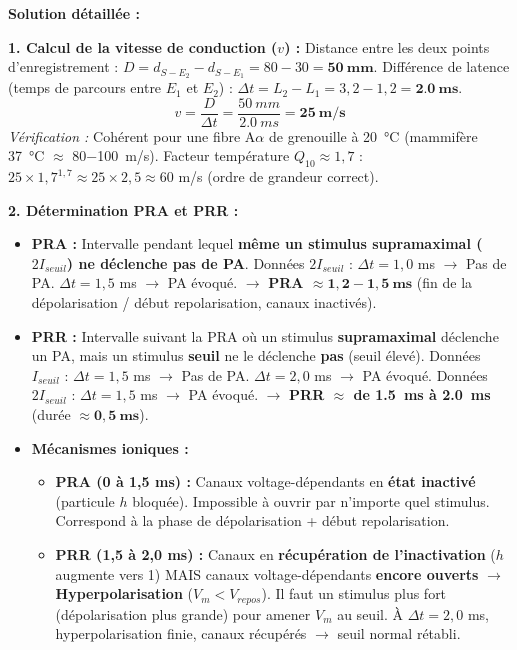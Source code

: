 \documentclass[11pt]{article}
\begin{document}
\begin{exoresolu}
\tcblower
\textbf{Solution détaillée :}

\textbf{1. Calcul de la vitesse de conduction ($v$) :}
Distance entre les deux points d'enregistrement : $D = d_{S-E_2} - d_{S-E_1} = 80 - 30 = \mathbf{\SI{50}{mm}}$.
Différence de latence (temps de parcours entre $E_1$ et $E_2$) : $\Delta t = L_2 - L_1 = 3,2 - 1,2 = \mathbf{\SI{2,0}{ms}}$.
\[ v = \frac{D}{\Delta t} = \frac{\SI{50}{mm}}{\SI{2,0}{ms}} = \mathbf{\SI{25}{m/s}} \]
\textit{Vérification :} Cohérent pour une fibre A$\alpha$ de grenouille à \SI{20}{\celsius} (mammifère \SI{37}{\celsius} $\approx$ \SI{80-100}{m/s}). Facteur température $Q_{10} \approx 1,7$ : $25 \times 1,7^{1,7} \approx 25 \times 2,5 \approx 60$ m/s (ordre de grandeur correct).

\textbf{2. Détermination PRA et PRR :}
\begin{itemize}
    \item \textbf{PRA :} Intervalle pendant lequel \textbf{même un stimulus supramaximal ($2 I_{seuil}$) ne déclenche pas de PA}.
    Données $2 I_{seuil}$ : $\Delta t = 1,0$ ms $\rightarrow$ Pas de PA. $\Delta t = 1,5$ ms $\rightarrow$ PA évoqué.
    $\rightarrow$ \textbf{PRA $\approx \mathbf{1,2 - 1,5\ ms}$} (fin de la dépolarisation / début repolarisation, canaux  inactivés).
    \item \textbf{PRR :} Intervalle suivant la PRA où un stimulus \textbf{supramaximal} déclenche un PA, mais un stimulus \textbf{seuil} ne le déclenche \textbf{pas} (seuil élevé).
    Données $I_{seuil}$ : $\Delta t = 1,5$ ms $\rightarrow$ Pas de PA. $\Delta t = 2,0$ ms $\rightarrow$ PA évoqué.
    Données $2 I_{seuil}$ : $\Delta t = 1,5$ ms $\rightarrow$ PA évoqué.
    $\rightarrow$ \textbf{PRR $\approx$ de \SI{1,5}{ms} à \SI{2,0}{ms}} (durée $\approx \mathbf{0,5\ ms}$).
    \item \textbf{Mécanismes ioniques :}
    \begin{itemize}
        \item \textbf{PRA (0 à 1,5 ms) :} Canaux  voltage-dépendants en \textbf{état inactivé} (particule $h$ bloquée). Impossible à ouvrir par n'importe quel stimulus. Correspond à la phase de dépolarisation + début repolarisation.
        \item \textbf{PRR (1,5 à 2,0 ms) :} Canaux  en \textbf{récupération de l'inactivation} ($h$ augmente vers 1) MAIS canaux  voltage-dépendants \textbf{encore ouverts} $\rightarrow$ \textbf{Hyperpolarisation} ($V_m < V_{repos}$). Il faut un stimulus plus fort (dépolarisation plus grande) pour amener $V_m$ au seuil. À $\Delta t = 2,0$ ms, hyperpolarisation finie, canaux  récupérés $\rightarrow$ seuil normal rétabli.
    \end{itemize}
\end{itemize}


\end{exoresolu}
\end{document}
